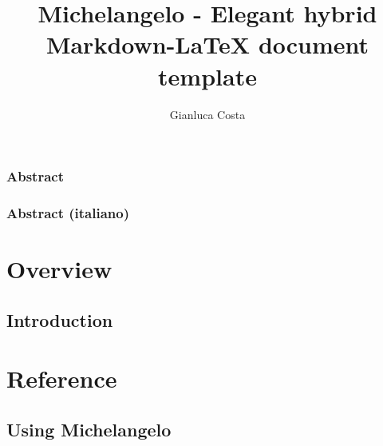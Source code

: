 \documentclass[11pt, a4paper]{book}
\begin{document}
\title{Michelangelo - Elegant hybrid Markdown-LaTeX document template}
\author{Gianluca Costa}

\maketitle

\newpage
\section*{Abstract}


\newpage
{}
\section*{Abstract (italiano)}


\tableofcontents


\part{Overview}

\chapter{Introduction}



\part{Reference}

\chapter{Using Michelangelo}


\nocite{*}



\end{document}
